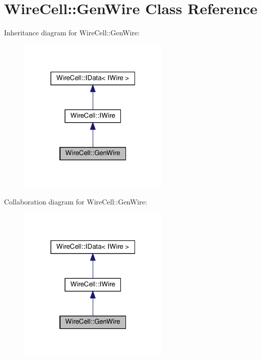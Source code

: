 \hypertarget{class_wire_cell_1_1_gen_wire}{}\section{Wire\+Cell\+:\+:Gen\+Wire Class Reference}
\label{class_wire_cell_1_1_gen_wire}


Inheritance diagram for Wire\+Cell\+:\+:Gen\+Wire\+:
\nopagebreak
\begin{figure}[H]
\begin{center}
\leavevmode
\includegraphics[width=205pt]{class_wire_cell_1_1_gen_wire__inherit__graph}
\end{center}
\end{figure}


Collaboration diagram for Wire\+Cell\+:\+:Gen\+Wire\+:
\nopagebreak
\begin{figure}[H]
\begin{center}
\leavevmode
\includegraphics[width=205pt]{class_wire_cell_1_1_gen_wire__coll__graph}
\end{center}
\end{figure}
